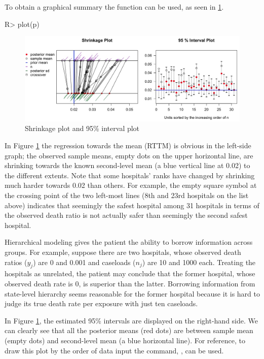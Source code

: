 \documentclass[article]{jss}
\begin{document}
To obtain a graphical summary the function  can be used, as seen in \ref{fig:hospshr}.

\begin{CodeChunk}
\begin{CodeInput}
R> plot(p)
\end{CodeInput}
\end{CodeChunk}
\begin{figure}[h]
\begin{center}
\includegraphics[scale=0.25]{hospital1.png}
\caption{Shrinkage plot and 95\% interval plot}
\label{fig:hospshr}
\end{center}
\end{figure}

In Figure \ref{fig:hospshr} the regression towards the mean (RTTM) is obvious in the left-side graph; the observed sample means, empty dots on the upper horizontal line, are shrinking towards the known second-level mean (a blue vertical line at 0.02) to the different extents. Note that some hospitals' ranks have changed by shrinking much harder towards 0.02 than others. For example, the empty square symbol at the crossing point of the two left-most lines (8th and 23rd hospitals on the list above) indicates that seemingly the safest hospital among 31 hospitals in terms of the observed death ratio is not actually safer than seemingly the second safest hospital. 


Hierarchical modeling gives the patient the ability to borrow information across groups. For example, suppose there are two hospitals, whose observed death ratios ($y_{j}$) are 0 and 0.001 and caseloads ($n_{j}$) are 10 and 1000 each. Treating the hospitals as unrelated, the patient may conclude that the former hospital, whose observed death rate is 0, is superior than the latter. Borrowing information from state-level hierarchy seems reasonable for the former hospital because it is hard to judge its true death rate per exposure with just ten caseloads.


In Figure \ref{fig:hospshr}, the estimated 95\% intervals are displayed on the right-hand side. We can clearly see that all the posterior means (red dots) are between sample mean (empty dots) and second-level mean (a blue horizontal line). For reference, to draw this plot by the order of data input the command, , can be used.
\end{document}
